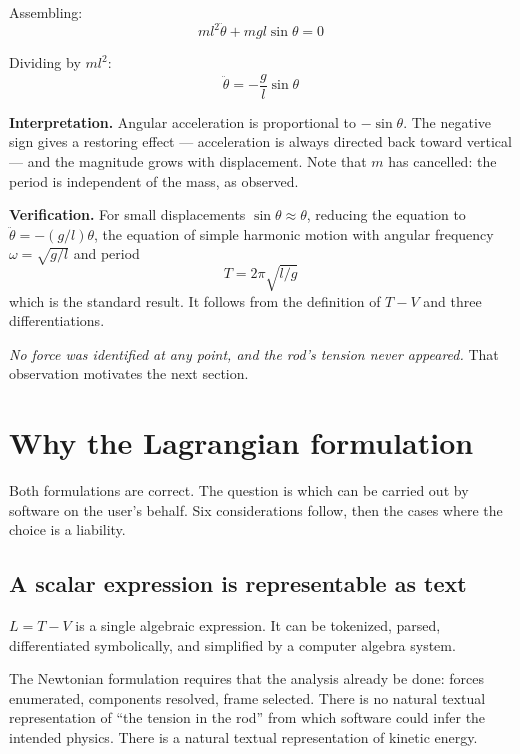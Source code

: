 \documentclass[11pt,a4paper]{article}
\begin{document}
Assembling:
\begin{equation}
m l^2 \ddot\theta + mgl\sin\theta = 0
\end{equation}

Dividing by $ml^2$:
\begin{equation}
\boxed{\ \ddot\theta = -\frac{g}{l}\sin\theta\ }
\end{equation}

\medskip
\noindent\textbf{Interpretation.} Angular acceleration is proportional to $-\sin\theta$. The
negative sign gives a restoring effect --- acceleration is always directed back toward vertical ---
and the magnitude grows with displacement. Note that $m$ has cancelled: the period is independent of
the mass, as observed.

\medskip
\noindent\textbf{Verification.} For small displacements $\sin\theta \approx \theta$, reducing the
equation to $\ddot\theta = -(g/l)\theta$, the equation of simple harmonic motion with angular
frequency $\omega = \sqrt{g/l}$ and period
\begin{equation}
T = 2\pi\sqrt{l/g}
\end{equation}
which is the standard result. It follows from the definition of $T - V$ and three differentiations.

\medskip
\noindent\emph{No force was identified at any point, and the rod's tension never appeared.} That
observation motivates the next section.

\section{Why the Lagrangian formulation}
\label{sec:why}

Both formulations are correct. The question is which can be carried out by software on the user's
behalf. Six considerations follow, then the cases where the choice is a liability.

\subsection{A scalar expression is representable as text}

$L = T - V$ is a single algebraic expression. It can be tokenized, parsed, differentiated
symbolically, and simplified by a computer algebra system.

The Newtonian formulation requires that the analysis already be done: forces enumerated, components
resolved, frame selected. There is no natural textual representation of ``the tension in the rod''
from which software could infer the intended physics. There is a natural textual representation of
kinetic energy.
\end{document}
